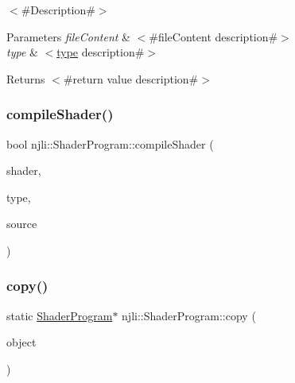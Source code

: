 $<$\#\+Description\#$>$


\begin{DoxyParams}{Parameters}
{\em file\+Content} & $<$\#file\+Content description\#$>$ \\
\hline
{\em type} & $<$\mbox{\hyperlink{classnjli_1_1_shader_program_a92e24de59f2e44318baab955895910ba}{type}} description\#$>$\\
\hline
\end{DoxyParams}
\begin{DoxyReturn}{Returns}
$<$\#return value description\#$>$ 
\end{DoxyReturn}
\mbox{\label{classnjli_1_1_shader_program_a47e7e27178632533e9d8c805f5482812}} 
\subsubsection{\texorpdfstring{compile\+Shader()}{compileShader()}}
{\footnotesize\ttfamily bool njli\+::\+Shader\+Program\+::compile\+Shader (\begin{DoxyParamCaption}\item[{\mbox{\hyperlink{_util_8h_aa62c75d314a0d1f37f79c4b73b2292e2}{s32}} $\ast$}]{shader,  }\item[{const \mbox{\hyperlink{_util_8h_a10e94b422ef0c20dcdec20d31a1f5049}{u32}}}]{type,  }\item[{const char $\ast$}]{source }\end{DoxyParamCaption})}

\mbox{\label{classnjli_1_1_shader_program_ac5ccaeffeccdfc14a2579eddb07e0a36}} 
\subsubsection{\texorpdfstring{copy()}{copy()}}
{\footnotesize\ttfamily static \mbox{\hyperlink{classnjli_1_1_shader_program}{Shader\+Program}}$\ast$ njli\+::\+Shader\+Program\+::copy (\begin{DoxyParamCaption}\item[{const \mbox{\hyperlink{classnjli_1_1_shader_program}{Shader\+Program}} \&}]{object }\end{DoxyParamCaption})\hspace{0.3cm}{\ttfamily [static]}}

